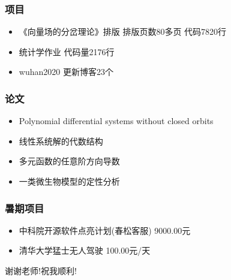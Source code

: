 \documentclass{beamer}
\begin{document}
\begin{frame}
  \frametitle{项目}
 \begin{itemize}
\item 《向量场的分岔理论》排版 排版页数80多页 代码7820行
\pause
\item 统计学作业 代码量2176行 
\pause
\item wuhan2020 更新博客23个
  
\end{itemize}

\end{frame}

\begin{frame}
  \frametitle{论文}
  
  \begin{itemize}
  \item Polynomial differential systems without closed orbits
    \pause
  \item 线性系统解的代数结构
    \pause
  \item 多元函数的任意阶方向导数
    \pause
  \item 一类微生物模型的定性分析
    \pause
  \end{itemize}
  
\end{frame}

\begin{frame}
  \frametitle{暑期项目}
  \begin{itemize}
  \item 中科院开源软件点亮计划(春松客服) 9000.00元
    \pause
  \item 清华大学猛士无人驾驶 100.00元/天
    \pause
  \end{itemize}
\end{frame}

\begin{frame}
  \begin{center}
\Huge { 谢谢老师!祝我顺利!}
  \end{center}
\end{frame}
\end{document}
